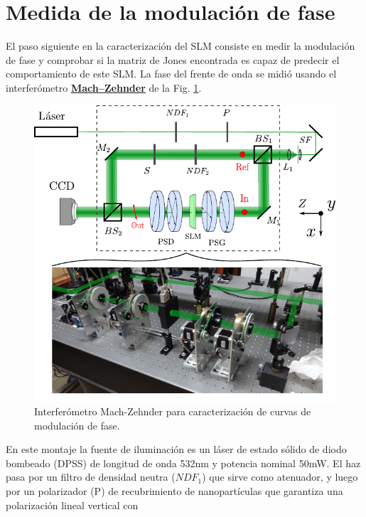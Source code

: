 \section{Medida de la modulación de fase}
El paso siguiente en la caracterización del SLM consiste en medir la
modulación de fase y comprobar si la matriz de Jones encontrada es
capaz de predecir el comportamiento de este SLM. 
La fase del frente de onda se midió usando el interferómetro
\href{http://en.wikipedia.org/wiki/Mach–Zehnder_interferometer}{\bf{Mach–Zehnder}}
de la Fig. \ref{fig:mach_zehnder}. 
\begin{figure}[h!]
\centering
\includegraphics[scale=1.1]{mach_zehnder.pdf}
\caption[Interferómetro Mach-Zehnder para caracterización de curvas de
modulación de fase]{Interferómetro Mach-Zehnder para caracterización de curvas de
modulación de fase. }
\label{fig:mach_zehnder}
\end{figure}
En este montaje la fuente de iluminación es un láser de estado sólido
de diodo bombeado (DPSS) de longitud de onda 532nm y potencia nominal
50mW. El haz pasa por un filtro de densidad neutra ($NDF_1$) que sirve como
atenuador, y luego por un polarizador (P) de recubrimiento de
nanopartículas que garantiza una polarización lineal vertical con
